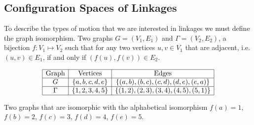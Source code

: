 \subsection{Configuration Spaces of Linkages}
To describe the types of motion that we are interested in linkages we must define the graph isomorphism.  Two graphs $G=(V_1,E_1)$ and $\Gamma = (V_2,E_2) $, a bijection $f: V_1 \mapsto V_2$ such that for any two vertices $u,v \in V_1$ that are adjacent, i.e. $(u, v) \in E_1$, if and only if $(f(u),f(v)) \in E_2$. 
\begin{table}[!ht]
\begin{center}
$$\begin{array}{|c|c|c|}\hline
\text{Graph}&\text{Vertices}&\text{Edges}\\\hline
G&\left\lbrace a,b,c,d,e \right\rbrace & \left\lbrace (a,b),(b,c),(c,d),(d,e),(e,a) \right\rbrace \\\hline
\Gamma&\left\lbrace 1,2,3,4,5 \right\rbrace & \left\lbrace (1,2),(2,3),(3,4),(4,5),(5,1) \right\rbrace \\\hline
\end{array} $$
\caption{Two graphs that are isomorphic with the alphabetical isomorphism $f(a)=1$, $f(b)=2$, $f(c) = 3$, $f(d)=4$, $f(e)=5$.}
\end{center} 
\label{table:linkage-1}
\end{table} 

